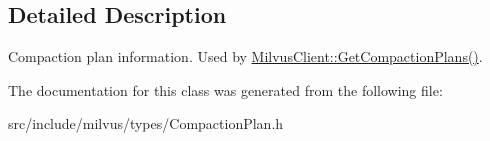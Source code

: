 \subsection{Detailed Description}
Compaction plan information. Used by \hyperlink{classmilvus_1_1_milvus_client_a39d54736f4b08bba8d6b055277aa71ea}{Milvus\+Client\+::\+Get\+Compaction\+Plans()}. 

The documentation for this class was generated from the following file\+:\begin{DoxyCompactItemize}
\item 
src/include/milvus/types/Compaction\+Plan.\+h\end{DoxyCompactItemize}
